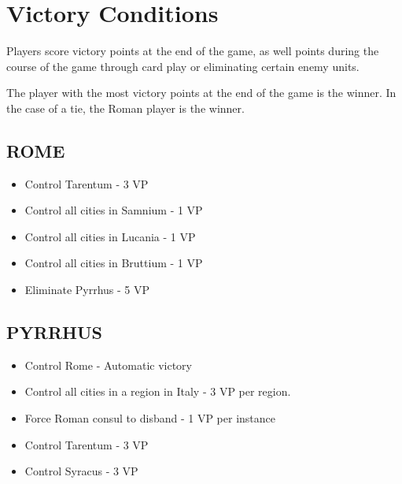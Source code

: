 \section{Victory Conditions}
Players score victory points at the end of the game, as well points during the course of the game through card play or eliminating certain enemy units.

The player with the most victory points at the end of the game is the winner. In the case of a tie, the Roman player is the winner.

\subsection{ROME}

\begin{itemize}
  \setlength{\itemsep}{-6pt}
  \item Control Tarentum - 3 VP
  \item Control all cities in Samnium - 1 VP
  \item Control all cities in Lucania - 1 VP
  \item Control all cities in Bruttium - 1 VP
  \item Eliminate Pyrrhus - 5 VP
\end{itemize}

\subsection{PYRRHUS}
\begin{itemize}
  \setlength{\itemsep}{-6pt}
  \item Control Rome - Automatic victory
  \item Control all cities in a region in Italy - 3 VP per region.
  \item Force Roman consul to disband - 1 VP per instance
  \item Control Tarentum - 3 VP
  \item Control Syracus - 3 VP
\end{itemize}